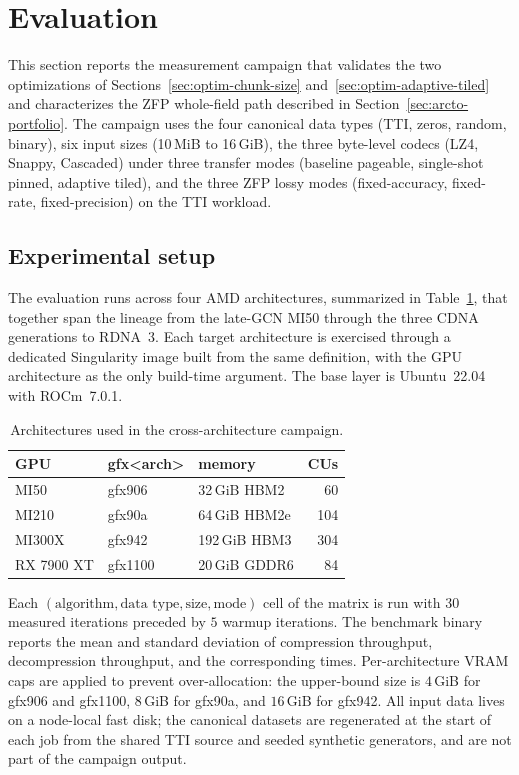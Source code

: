 \section{Evaluation}
\label{sec:evaluation}

This section reports the measurement campaign that validates the two
optimizations of Sections~\ref{sec:optim-chunk-size}
and~\ref{sec:optim-adaptive-tiled} and characterizes the ZFP whole-field
path described in Section~\ref{sec:arcto-portfolio}. The campaign uses
the four canonical data types (TTI, zeros, random, binary), six input
sizes (10\,MiB to 16\,GiB), the three byte-level codecs (LZ4, Snappy,
Cascaded) under three transfer modes (baseline pageable, single-shot
pinned, adaptive tiled), and the three ZFP lossy modes
(fixed-accuracy, fixed-rate, fixed-precision) on the TTI workload.

\subsection{Experimental setup}
\label{sec:eval-setup}

The evaluation runs across four AMD architectures, summarized in
Table~\ref{tab:eval-hw}, that together span the lineage from the
late-GCN MI50 through the three CDNA generations to RDNA~3. Each
target architecture is exercised through a dedicated Singularity
image built from the same definition, with the GPU architecture as
the only build-time argument. The base layer is Ubuntu~22.04 with
ROCm~7.0.1.

\begin{table}[t]
\centering
\caption{Architectures used in the cross-architecture campaign.}
\label{tab:eval-hw}
\begin{tabular}{lllr}
\toprule
GPU         & gfx<arch> & memory                & CUs \\
\midrule
MI50        & gfx906    & 32\,GiB HBM2          &  60 \\
MI210       & gfx90a    & 64\,GiB HBM2e         & 104 \\
MI300X      & gfx942    & 192\,GiB HBM3         & 304 \\
RX 7900 XT  & gfx1100   & 20\,GiB GDDR6         &  84 \\
\bottomrule
\end{tabular}
\end{table}

Each $(\text{algorithm}, \text{data type}, \text{size}, \text{mode})$
cell of the matrix is run with $30$ measured iterations preceded by
$5$ warmup iterations. The benchmark binary reports the mean and
standard deviation of compression throughput, decompression throughput,
and the corresponding times. Per-architecture VRAM caps are applied to
prevent over-allocation: the upper-bound size is $4$\,GiB for gfx906
and gfx1100, $8$\,GiB for gfx90a, and $16$\,GiB for gfx942. All input
data lives on a node-local fast disk; the canonical datasets are
regenerated at the start of each job from the shared TTI source and
seeded synthetic generators, and are not part of the campaign output.


